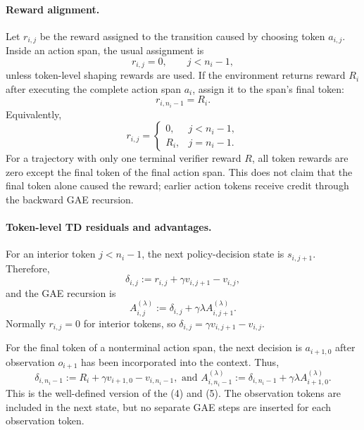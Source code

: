 \paragraph{Reward alignment.}
Let $r_{i,j}$ be the reward assigned to the transition caused by choosing token $a_{i,j}$. Inside an action span, the usual assignment is
\[
    r_{i,j}=0,\qquad j<n_i-1,
\]
unless token-level shaping rewards are used. If the environment returns reward $R_i$ after executing the complete action span $a_i$, assign it to the span's final token:
\[
    r_{i,n_i-1}=R_i.
\]
Equivalently,
\[
    r_{i,j}
    =
    \begin{cases}
        0, & j<n_i-1,\\
        R_i, & j=n_i-1.
    \end{cases}
\]
For a trajectory with only one terminal verifier reward $R$, all token rewards are zero except the final token of the final action span. This does not claim that the final token alone caused the reward; earlier action tokens receive credit through the backward GAE recursion.

\paragraph{Token-level TD residuals and advantages.}
For an interior token $j<n_i-1$, the next policy-decision state is $s_{i,j+1}$. Therefore,
\[
    \delta_{i,j}:=r_{i,j}+\gamma v_{i,j+1}-v_{i,j},
\]
and the GAE recursion is
\[
    A^{(\lambda)}_{i,j}:=\delta_{i,j}+\gamma\lambda A^{(\lambda)}_{i,j+1}.
\]
Normally $r_{i,j}=0$ for interior tokens, so $\delta_{i,j}=\gamma v_{i,j+1}-v_{i,j}$.

For the final token of a nonterminal action span, the next decision is $a_{i+1,0}$ after observation $o_{i+1}$ has been incorporated into the context. Thus,
\[
    \delta_{i,n_i-1}:=R_i+\gamma v_{i+1,0}-v_{i,n_i-1},
\text{ and }
    A^{(\lambda)}_{i,n_i-1}:=\delta_{i,n_i-1}+\gamma\lambda A^{(\lambda)}_{i+1,0}.
\]
This is the well-defined version of the \citet{hou2026single} (4) and (5). The observation tokens are included in the next state, but no separate GAE steps are inserted for each observation token.

